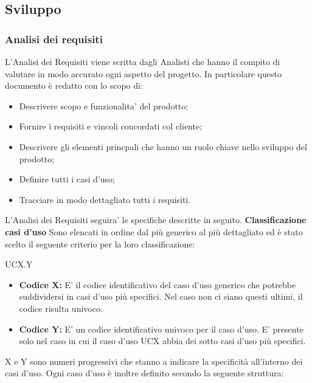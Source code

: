 \subsection{Sviluppo}
    \subsubsection{Analisi dei requisiti}
    	L'Analisi dei Requisiti viene scritta dagli Analisti che hanno il compito di valutare in modo accurato ogni aspetto del progetto. In particolare questo documento è redatto con lo scopo di:
	    \begin{itemize}
	    	\item Descrivere scopo e funzionalita' del prodotto;
	    	\item Fornire i requisiti e vincoli concordati col cliente;
	    	\item Descrivere gli elementi princpali che hanno un ruolo chiave nello sviluppo del prodotto;
	    	\item Definire tutti i casi d'uso;
	    	\item Tracciare in modo dettagliato tutti i requisiti.\newline
	    \end{itemize}
    	L'Analisi dei Requisiti seguira' le specifiche descritte in seguito.\newline \newline
    	\textbf{Classificazione casi d'uso} Sono elencati in ordine dal più generico al più dettagliato ed è stato scelto il seguente criterio per la loro classificazione: \newline
	    \begin{center}
	    	UCX.Y
	    \end{center}
	    \begin{itemize}
	    	\item \textbf{Codice X:} E' il codice identificativo del caso d'uso generico che potrebbe suddividersi
	    	in casi d'uso più specifici. Nel caso non ci siano questi ultimi, il codice risulta univoco.
	    	\item \textbf{Codice Y:} E' un codice identificativo univoco per il caso d'uso. E' presente solo nel
	    	caso in cui il caso d'uso UCX abbia dei sotto casi d'uso più specifici.
	    \end{itemize}
	    X e Y sono numeri progressivi che stanno a indicare la specificità all'interno dei casi d'uso.\newline
	    Ogni caso d'uso è inoltre definito secondo la seguente struttura:\newline
